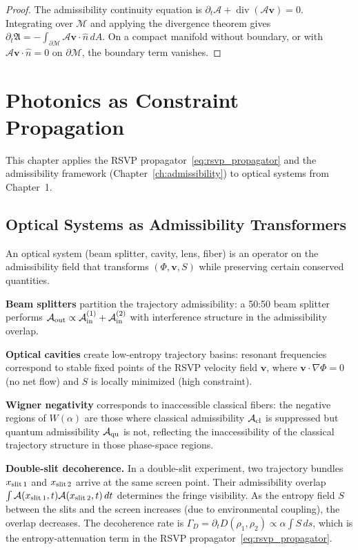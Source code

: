 \documentclass[11pt, openright, twoside]{book}
\theoremstyle{plain}
\theoremstyle{definition}
\theoremstyle{remark}
\newcommand{\vfield}{\mathbf{v}}
\newcommand{\Sfield}{S}
\newcommand{\rsvp}{(\Phi,\vfield,\Sfield)}
\newcommand{\Admiss}{\mathcal{A}}
\begin{document}
\begin{proof}
The admissibility continuity equation is
$\partial_t\Admiss+\operatorname{div}(\Admiss\vfield)=0$.
Integrating over $\mathcal{M}$ and applying the divergence theorem gives
$\partial_t\mathfrak{A}=-\int_{\partial\mathcal{M}}\Admiss\vfield\cdot\hat n\,dA$.
On a compact manifold without boundary, or with $\Admiss\vfield\cdot\hat n=0$ on $\partial\mathcal{M}$,
the boundary term vanishes.
\end{proof}

\chapter{Photonics as Constraint Propagation}
\label{ch:photonics_constraint}

\begin{depbox}
This chapter applies the RSVP propagator~\eqref{eq:rsvp_propagator} and the admissibility
framework (Chapter~\ref{ch:admissibility}) to optical systems from Chapter~1.
\end{depbox}

\section{Optical Systems as Admissibility Transformers}

An optical system (beam splitter, cavity, lens, fiber) is an operator on the admissibility
field that transforms $\rsvp$ while preserving certain conserved quantities.

\textbf{Beam splitters} partition the trajectory admissibility: a 50:50 beam splitter
performs $\Admiss_{\rm out}\propto\Admiss_{\rm in}^{(1)}+\Admiss_{\rm in}^{(2)}$
with interference structure in the admissibility overlap.

\textbf{Optical cavities} create low-entropy trajectory basins: resonant frequencies
correspond to stable fixed points of the RSVP velocity field $\vfield$, where
$\vfield\cdot\nabla\Phi=0$ (no net flow) and $\Sfield$ is locally minimized (high constraint).

\textbf{Wigner negativity} corresponds to inaccessible classical fibers: the negative
regions of $W(\alpha)$ are those where classical admissibility $\Admiss_{\rm cl}$ is
suppressed but quantum admissibility $\Admiss_{\rm qu}$ is not, reflecting the inaccessibility
of the classical trajectory structure in those phase-space regions.

\begin{exbox}
\textbf{Double-slit decoherence.} In a double-slit experiment, two trajectory bundles
$x_{\rm slit\,1}$ and $x_{\rm slit\,2}$ arrive at the same screen point. Their admissibility
overlap $\int\Admiss(x_{\rm slit\,1},t)\Admiss(x_{\rm slit\,2},t)\,dt$ determines the
fringe visibility. As the entropy field $\Sfield$ between the slits and the screen increases
(due to environmental coupling), the overlap decreases. The decoherence rate is
$\Gamma_D = \partial_t D(\rho_1,\rho_2) \propto \alpha\int\Sfield\,ds$, which is the
entropy-attenuation term in the RSVP propagator~\eqref{eq:rsvp_propagator}.
\end{exbox}
\end{document}
